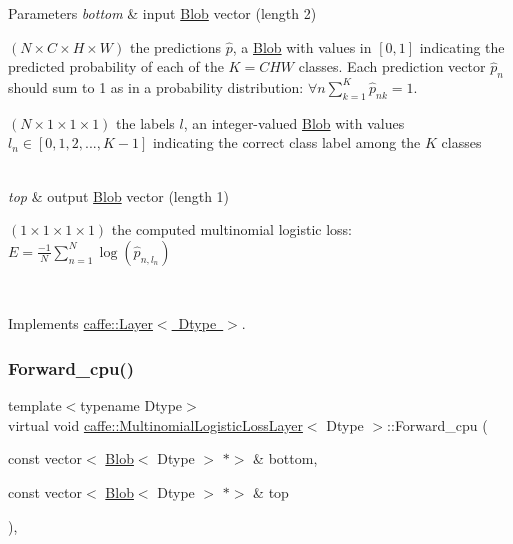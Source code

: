 \begin{DoxyParams}{Parameters}
{\em bottom} & input \mbox{\hyperlink{classcaffe_1_1_blob}{Blob}} vector (length 2)
\begin{DoxyEnumerate}
\item $ (N \times C \times H \times W) $ the predictions $ \hat{p} $, a \mbox{\hyperlink{classcaffe_1_1_blob}{Blob}} with values in $ [0, 1] $ indicating the predicted probability of each of the $ K = CHW $ classes. Each prediction vector $ \hat{p}_n $ should sum to 1 as in a probability distribution\+: $ \forall n \sum\limits_{k=1}^K \hat{p}_{nk} = 1 $.
\item $ (N \times 1 \times 1 \times 1) $ the labels $ l $, an integer-\/valued \mbox{\hyperlink{classcaffe_1_1_blob}{Blob}} with values $ l_n \in [0, 1, 2, ..., K - 1] $ indicating the correct class label among the $ K $ classes 
\end{DoxyEnumerate}\\
\hline
{\em top} & output \mbox{\hyperlink{classcaffe_1_1_blob}{Blob}} vector (length 1)
\begin{DoxyEnumerate}
\item $ (1 \times 1 \times 1 \times 1) $ the computed multinomial logistic loss\+: $ E = \frac{-1}{N} \sum\limits_{n=1}^N \log(\hat{p}_{n,l_n}) $ 
\end{DoxyEnumerate}\\
\hline
\end{DoxyParams}


Implements \mbox{\hyperlink{classcaffe_1_1_layer_a576ac6a60b1e99fe383831f52a6cea77}{caffe\+::\+Layer$<$ Dtype $>$}}.

\mbox{\label{classcaffe_1_1_multinomial_logistic_loss_layer_a92a355f79ca6d47741712f85fd79ab97}} 
\subsubsection{\texorpdfstring{Forward\+\_\+cpu()}{Forward\_cpu()}\hspace{0.1cm}{\footnotesize\ttfamily [2/2]}}
{\footnotesize\ttfamily template$<$typename Dtype$>$ \\
virtual void \mbox{\hyperlink{classcaffe_1_1_multinomial_logistic_loss_layer}{caffe\+::\+Multinomial\+Logistic\+Loss\+Layer}}$<$ Dtype $>$\+::Forward\+\_\+cpu (\begin{DoxyParamCaption}\item[{const vector$<$ \mbox{\hyperlink{classcaffe_1_1_blob}{Blob}}$<$ Dtype $>$ $\ast$$>$ \&}]{bottom,  }\item[{const vector$<$ \mbox{\hyperlink{classcaffe_1_1_blob}{Blob}}$<$ Dtype $>$ $\ast$$>$ \&}]{top }\end{DoxyParamCaption})\hspace{0.3cm}{\ttfamily [protected]}, {\ttfamily [virtual]}}



